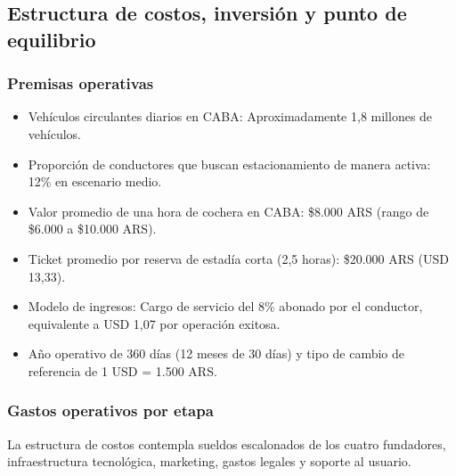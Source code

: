 \subsection{Estructura de costos, inversión y punto de equilibrio}

\subsubsection{Premisas operativas}

\begin{itemize}
    \item Vehículos circulantes diarios en CABA: Aproximadamente 1,8 millones de vehículos.
    \item Proporción de conductores que buscan estacionamiento de manera activa: 12\% en escenario medio.
    \item Valor promedio de una hora de cochera en CABA: \$8.000 ARS (rango de \$6.000 a \$10.000 ARS).
    \item Ticket promedio por reserva de estadía corta (2,5 horas): \$20.000 ARS (USD 13,33).
    \item Modelo de ingresos: Cargo de servicio del 8\% abonado por el conductor, equivalente a USD 1,07 por operación exitosa.
    \item Año operativo de 360 días (12 meses de 30 días) y tipo de cambio de referencia de 1 USD = 1.500 ARS.
\end{itemize}

\subsubsection{Gastos operativos por etapa}

La estructura de costos contempla sueldos escalonados de los cuatro fundadores, infraestructura tecnológica, marketing, gastos legales y soporte al usuario.


